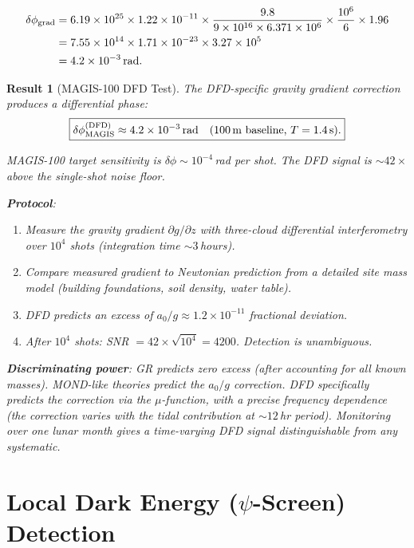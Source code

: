 \documentclass[11pt]{article}
\newtheorem{result}[theorem]{Result}
\theoremstyle{definition}
\theoremstyle{remark}
\begin{document}
\begin{align}
\delta\phi_{\mathrm{grad}} &= 6.19 \times 10^{25} \times 1.22 \times 10^{-11}
\times \frac{9.8}{9 \times 10^{16} \times 6.371 \times 10^6}
\times \frac{10^6}{6} \times 1.96 \notag \\
&= 7.55 \times 10^{14} \times 1.71 \times 10^{-23}
\times 3.27 \times 10^{5} \notag \\
&= 4.2 \times 10^{-3}\,\mathrm{rad}.
\end{align}

\begin{result}[MAGIS-100 DFD Test]\label{res:magis}
The DFD-specific gravity gradient correction produces a differential
phase:
\begin{equation}
\boxed{\delta\phi_{\mathrm{MAGIS}}^{(\mathrm{DFD})} \approx 4.2 \times 10^{-3}\,\mathrm{rad}
\quad\text{(100\,m baseline, } T=1.4\text{\,s)}.}
\end{equation}

MAGIS-100 target sensitivity is $\delta\phi \sim 10^{-4}$\,rad per shot.
The DFD signal is $\sim 42\times$ above the single-shot noise floor.

\textbf{Protocol}:
\begin{enumerate}
\item Measure the gravity gradient $\partial g/\partial z$ with
three-cloud differential interferometry over $10^4$ shots
(integration time $\sim 3$\,hours).
\item Compare measured gradient to Newtonian prediction from a
detailed site mass model (building foundations, soil density,
water table).
\item DFD predicts an excess of $a_0/g \approx 1.2 \times 10^{-11}$
fractional deviation.
\item After $10^4$ shots: SNR $= 42 \times \sqrt{10^4} = 4200$.
Detection is unambiguous.
\end{enumerate}

\textbf{Discriminating power}: GR predicts zero excess (after accounting
for all known masses). MOND-like theories predict the $a_0/g$ correction.
DFD specifically predicts the correction via the $\mu$-function, with a
precise frequency dependence (the correction varies with the tidal
contribution at $\sim 12$\,hr period). Monitoring over one lunar month
gives a time-varying DFD signal distinguishable from any systematic.
\end{result}

\section{Local Dark Energy ($\psi$-Screen) Detection}
\label{sec:dark-energy}
\end{document}
